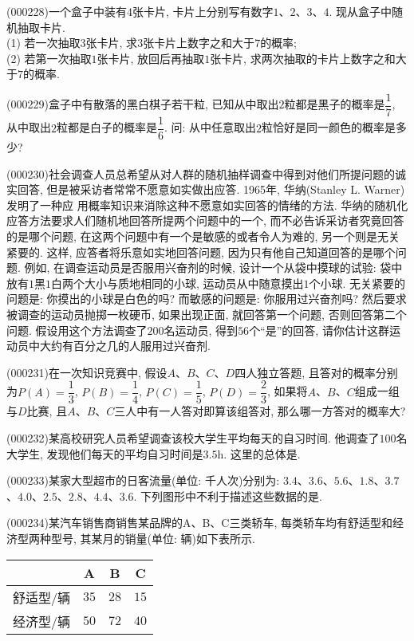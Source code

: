 \item (000228)一个盒子中装有$4$张卡片, 卡片上分别写有数字$1$、$2$、$3$、$4$. 现从盒子中随机抽取卡片.\\
(1) 若一次抽取$3$张卡片, 求$3$张卡片上数字之和大于$7$的概率;\\
(2) 若第一次抽取$1$张卡片, 放回后再抽取$1$张卡片, 求两次抽取的卡片上数字之和大于$7$的概率.
\item (000229)盒子中有散落的黑白棋子若干粒, 已知从中取出$2$粒都是黑子的概率是$\dfrac 17$, 从中取出$2$粒都是白子的概率是$\dfrac 16$. 问: 从中任意取出$2$粒恰好是同一颜色的概率是多少?
\item (000230)社会调查人员总希望从对人群的随机抽样调查中得到对他们所提问题的诚实回答, 但是被采访者常常不愿意如实做出应答. 1965年, 华纳(Stanley L. Warner)发明了一种应
用概率知识来消除这种不愿意如实回答的情绪的方法. 华纳的随机化应答方法要求人们随机地回答所提两个问题中的一个, 而不必告诉采访者究竟回答的是哪个问题, 在这两个问题中有一个是敏感的或者令人为难的, 另一个则是无关紧要的. 这样, 应答者将乐意如实地回答问题, 因为只有他自己知道回答的是哪个问题. 例如, 在调查运动员是否服用兴奋剂的时候, 设计一个从袋中摸球的试验: 袋中放有$1$黑$1$白两个大小与质地相同的小球, 运动员从中随意摸出$1$个小球. 无关紧要的问题是: 你摸出的小球是白色的吗? 而敏感的问题是: 你服用过兴奋剂吗? 然后要求被调查的运动员抛掷一枚硬币, 如果出现正面, 就回答第一个问题, 否则回答第二个问题. 假设用这个方法调查了$200$名运动员, 得到$56$个``是''的回答, 请你估计这群运动员中大约有百分之几的人服用过兴奋剂.
\item (000231)在一次知识竞赛中, 假设$A$、$B$、$C$、$D$四人独立答题, 且答对的概率分别为$P(A)=\dfrac 13$, $P(B)=\dfrac 14$, $P(C)=\dfrac 15$, $P(D)=\dfrac 23$, 如果将$A$、$B$、$C$组成一组与$D$比赛, 且$A$、$B$、$C$三人中有一人答对即算该组答对, 那么哪一方答对的概率大?
\item (000232)某高校研究人员希望调查该校大学生平均每天的自习时间. 他调查了$100$名大学生, 发现他们每天的平均自习时间是$3.5\text{h}$. 这里的总体是.
\item (000233)某家大型超市的日客流量(单位: 千人次)分别为: $3.4$、$3.6$、$5.6$、$1.8$、$3.7$、$4.0$、$2.5$、$2.8$、$4.4$、$3.6$. 下列图形中不利于描述这些数据的是.
\item (000234)某汽车销售商销售某品牌的A、B、C三类轿车, 每类轿车均有舒适型和经济型两种型号, 其某月的销量(单位: 辆)如下表所示.
\begin{center}
    \begin{tabular}{|c|c|c|c|}
        \hline
        & A & B & C \\ \hline
        舒适型/辆 & $35$ & $28$ & $15$\\ \hline
        经济型/辆 & $50$ & $72$ & $40$\\ \hline
    \end{tabular}
\end{center}
